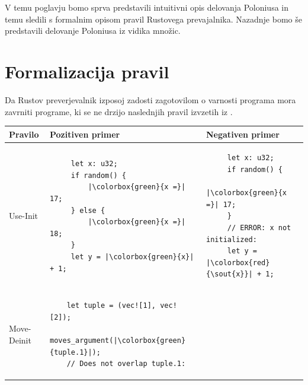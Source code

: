 \documentclass[a4paper,12pt,openright]{book}
\newcommand{\goodexample}[1]{\colorbox{green}{#1}}
\newcommand{\badexample}[1]{\colorbox{red}{\sout{#1}}}
\begin{document}
V temu poglavju bomo sprva predstavili intuitivni opis delovanja Poloniusa in temu sledili s formalnim opisom pravil Rustovega prevajalnika. Nazadnje bomo še predstavili delovanje Poloniusa iz vidika množic.

\section{Formalizacija pravil}
Da Rustov preverjevalnik izposoj zadosti zagotovilom o varnosti programa mora zavrniti programe,
ki se ne drzijo naslednjih pravil izvzetih iz \cite{stjernaModellingRustsReference}.

{ \renewcommand{\arraystretch}{2.0}
\begin{table}[!htbp]
	\begin{tabular}{p{} p{} p{}}
		Pravilo                                                     & Pozitiven primer & Negativen primer \\ \toprule
		Use-Init                                                    &                                     %
		\begin{minipage}[t]{0.41\textwidth}
			\begin{verbatim}
     let x: u32;
     if random() {
         |\goodexample{x =}| 17;
     } else {
         |\goodexample{x =}| 18;
     }
     let y = |\goodexample{x}| + 1;
    \end{verbatim}
		\end{minipage}           &                                                  %
		\begin{minipage}[t]{0.41\textwidth}
			\begin{verbatim}
     let x: u32;
     if random() {
         |\goodexample{x =}| 17;
     }
     // ERROR: x not initialized:
     let y = |\badexample{x}| + 1;
    \end{verbatim}
		\end{minipage}                                                  \\
		Move-Deinit                                                 &                                     %
		\begin{minipage}[t]{0.41\textwidth}
			\begin{verbatim}
    let tuple = (vec![1], vec![2]);
    moves_argument(|\goodexample{tuple.1}|);
    // Does not overlap tuple.1:

\end{verbatim}
\end{minipage}
\end{tabular}
\end{table}}
\end{document}

